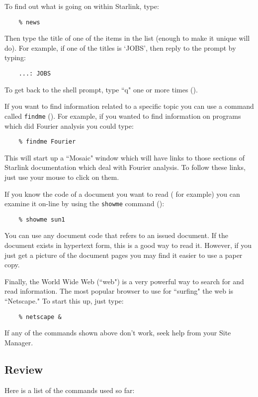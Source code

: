 To find out what is going on within Starlink, type:
\begin{verbatim}
    % news
\end{verbatim}
Then type the title of one of the items in the list (enough to make it
unique will do).
For example, if one of the titles is `JOBS', then reply to the prompt
by typing:
\begin{verbatim}
    ...: JOBS
\end{verbatim}
To get back to the shell prompt, type ``q" one or more times
().

If you want to find information related to a specific topic you can use a
command called {\tt findme} ().
For example, if you wanted to find information on programs which did
Fourier analysis you could type:
\begin{verbatim}
    % findme Fourier
\end{verbatim}
This will start up a ``Mosaic" window which will have links to those sections
of Starlink documentation which deal with Fourier analysis.
To follow these links, just use your mouse to click on them.

If you know the code of a document you want to read
( for example)
you can examine it on-line by using the {\tt showme} command
():
\begin{verbatim}
    % showme sun1
\end{verbatim}
You can use any document code that refers to an issued document.
If the document exists in hypertext form, this is a good way to read it.
However, if you just get a picture of the document pages you may find it
easier to use a paper copy.

Finally, the World Wide Web (``web") is a very powerful way to search for and
read information.
The most popular browser to use for ``surfing" the web is ``Netscape."
To start this up, just type:
\begin{verbatim}
    % netscape &
\end{verbatim}
If any of the commands shown above don't work, seek help from your Site
Manager.

\newpage

\subsection{Review}

Here is a list of the commands used so far:

